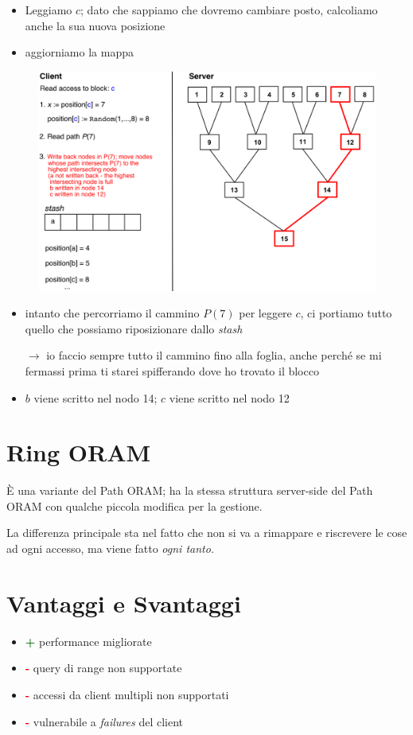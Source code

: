 \documentclass{report}
\begin{document}
\begin{itemize}
    \item Leggiamo $c$; dato che sappiamo che dovremo cambiare posto, calcoliamo 
    anche la sua nuova posizione
    \item aggiorniamo la mappa
\end{itemize}

\begin{figure}[ht]
    \centering
    \includegraphics[width=0.8\linewidth]{images/path-oram3.png}
\end{figure}

\begin{itemize}
    \item intanto che percorriamo il cammino $P(7)$ per leggere $c$, ci portiamo 
    tutto quello che possiamo riposizionare dallo \textit{stash}

    $\rightarrow$ io faccio sempre tutto il cammino fino alla foglia, anche perché se mi fermassi prima 
    ti starei spifferando dove ho trovato il blocco
    \item $b$ viene scritto nel nodo 14; $c$ viene scritto nel nodo 12
\end{itemize}

\section{Ring ORAM}
È una variante del Path ORAM; ha la stessa struttura server-side del 
Path ORAM con qualche piccola modifica per la gestione.

\noindent La differenza principale sta nel fatto che non si va 
a rimappare e riscrevere le cose ad ogni accesso, ma viene fatto 
\textit{ogni tanto}.

\section{Vantaggi e Svantaggi}
\begin{itemize}
    \item \textcolor{darkgreen}{\textbf{+}} performance migliorate
    \item \textcolor{red}{\textbf{-}} query di range non supportate
    \item \textcolor{red}{\textbf{-}} accessi da client multipli non supportati 
    \item \textcolor{red}{\textbf{-}} vulnerabile a \textit{failures} del client
\end{itemize}
\end{document}
